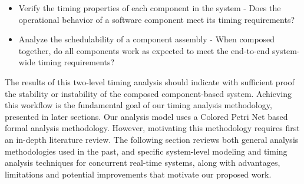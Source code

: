 \begin{itemize}
	\item Verify the timing properties of each component in the system - Does the operational behavior of a software component meet its timing requirements?
	
	\item Analyze the schedulability of a component assembly - When composed together, do all components work as expected to meet the end-to-end system-wide timing requirements?
\end{itemize}

The results of this two-level timing analysis should indicate with sufficient proof the stability or instability of the composed component-based system. Achieving this workflow is the fundamental goal of our timing analysis methodology, presented in later sections. Our analysis model uses a Colored Petri Net \cite{CPN} based formal analysis methodology. However, motivating this methodology requires first an in-depth literature review. The following section reviews both general analysis methodologies used in the past, and specific system-level modeling and timing analysis techniques for concurrent real-time systems, along with advantages, limitations and potential improvements that motivate our proposed work.

